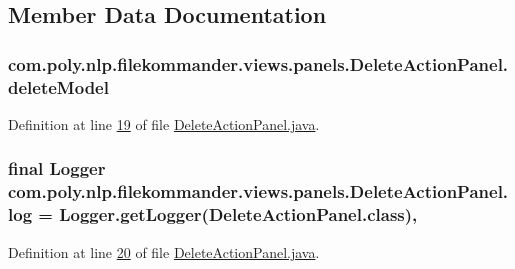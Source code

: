 \subsection{Member Data Documentation}
\hypertarget{classcom_1_1poly_1_1nlp_1_1filekommander_1_1views_1_1panels_1_1_delete_action_panel_a17228ab26020f99bdef1f28e0d525d39}{
\subsubsection[{delete\-Model}]{ com.\-poly.\-nlp.\-filekommander.\-views.\-panels.\-Delete\-Action\-Panel.\-delete\-Model\hspace{0.3cm}{\ttfamily [private]}}}\label{classcom_1_1poly_1_1nlp_1_1filekommander_1_1views_1_1panels_1_1_delete_action_panel_a17228ab26020f99bdef1f28e0d525d39}


Definition at line \hyperlink{L19}{19} of file \hyperlink{}{Delete\-Action\-Panel.\-java}.

\hypertarget{classcom_1_1poly_1_1nlp_1_1filekommander_1_1views_1_1panels_1_1_delete_action_panel_a01ad2752427baebc7718fbea69537476}{
\subsubsection[{log}]{\setlength{\rightskip}{0pt plus 5cm}final Logger com.\-poly.\-nlp.\-filekommander.\-views.\-panels.\-Delete\-Action\-Panel.\-log = Logger.\-get\-Logger(Delete\-Action\-Panel.\-class)\hspace{0.3cm}{\ttfamily [static]}, {\ttfamily [private]}}}\label{classcom_1_1poly_1_1nlp_1_1filekommander_1_1views_1_1panels_1_1_delete_action_panel_a01ad2752427baebc7718fbea69537476}


Definition at line \hyperlink{L20}{20} of file \hyperlink{}{Delete\-Action\-Panel.\-java}.

